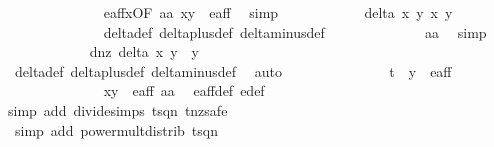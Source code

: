\begin{isabellebody}
\ \ \ \ \ \ \ \ \ \ \ \ \isamarkupfalse%
\ e{\isacharunderscore}aff{\isacharunderscore}x{}{\isacharbrackleft}OF\ aa\ {\isacartoucheopen}{\isacharparenleft}x{\isacharprime}{\isacharcomma}y{\isacharprime}{\isacharparenright}\ {\isasymin}\ e{\isacharunderscore}aff{\isacartoucheclose}{\isacharbrackright}\ \isamarkupfalse%
\ simp\isanewline
\ \ \ \ \ \ \ \ \ \ \isamarkupfalse%
\ {\isachardoublequoteopen}delta\ x\ y\ x{\isacharprime}\ y{\isacharprime}\ {\isasymnoteq}\ {}{\isachardoublequoteclose}\ \isanewline
\ \ \ \ \ \ \ \ \ \ \ \ \isamarkupfalse%
\ delta{\isacharunderscore}def\ delta{\isacharunderscore}plus{\isacharunderscore}def\ delta{\isacharunderscore}minus{\isacharunderscore}def\isanewline
\ \ \ \ \ \ \ \ \ \ \ \ \isamarkupfalse%
\ aa\ \isamarkupfalse%
\ simp\isanewline
\ \ \ \ \ \ \ \ \ \ \isamarkupfalse%
\ d{\isacharunderscore}{}{\isacharunderscore}nz{\isacharcolon}\ {\isachardoublequoteopen}delta\ x\ y\ {}\ y{\isacharprime}\ {\isasymnoteq}\ {}{\isachardoublequoteclose}\ \isanewline
\ \ \ \ \ \ \ \ \ \ \ \ \isamarkupfalse%
\ delta{\isacharunderscore}def\ delta{\isacharunderscore}plus{\isacharunderscore}def\ delta{\isacharunderscore}minus{\isacharunderscore}def\ \isamarkupfalse%
\ auto\isanewline
\ \ \ \ \ \ \ \ \ \ \isamarkupfalse%
\ {\isachardoublequoteopen}{\isacharparenleft}{}{\isacharcomma}\ {}\ {\isacharslash}\ {\isacharparenleft}t\ {\isacharasterisk}\ y{\isacharprime}{\isacharparenright}{\isacharparenright}\ {\isasymnotin}\ e{\isacharunderscore}aff{\isachardoublequoteclose}\isanewline
\ \ \ \ \ \ \ \ \ \ \ \ \isamarkupfalse%
\ {\isacartoucheopen}{\isacharparenleft}x{\isacharprime}{\isacharcomma}y{\isacharprime}{\isacharparenright}\ {\isasymin}\ e{\isacharunderscore}aff{\isacartoucheclose}\ aa\ \isamarkupfalse%
\ e{\isacharunderscore}aff{\isacharunderscore}def\ e{\isacharprime}{\isacharunderscore}def\ \isanewline
\ \ \ \ \ \ \ \ \ \ \ \ \isamarkupfalse%
{\isacharparenleft}simp\ add{\isacharcolon}\ divide{\isacharunderscore}simps\ t{\isacharunderscore}sq{\isacharunderscore}n{}\ t{\isacharunderscore}nz{\isacharcomma}safe{\isacharparenright}\isanewline
\ \ \ \ \ \ \ \ \ \ \ \ \isamarkupfalse%
\ {\isacharparenleft}simp\ add{\isacharcolon}\ power{\isacharunderscore}mult{\isacharunderscore}distrib\ t{\isacharunderscore}sq{\isacharunderscore}n{}{\isacharparenright}\isanewline

\end{isabellebody}
